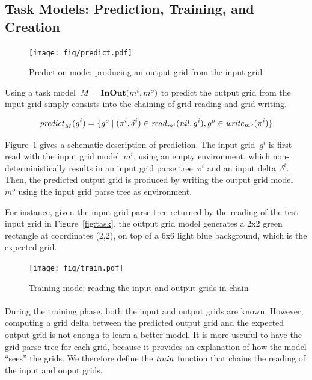 \documentclass[a4paper]{llncs}
\begin{document}
\subsection{Task Models: Prediction, Training, and Creation}
\label{training:predicting}


\begin{figure}[t]
  \centering
  \texttt{[image: fig/predict.pdf]}
  \caption{Prediction mode: producing an output grid from the input grid}
  \label{fig:predict}
\end{figure}

Using a task model~$M = {\bf InOut}(m^i,m^o)$ to predict the output
grid from the input grid simply consists into the chaining of grid reading and grid writing.


\[ {\it predict}_M(g^i) = \{g^o \mid (\pi^i,\delta^i) \in {\it read}_{m^i}({\it nil},g^i), g^o \in {\it write}_{m^o}(\pi^i) \} \]

Figure~\ref{fig:predict} gives a schematic description of
prediction. The input grid~$g^i$ is first read with the input grid
model~$m^i$, using an empty environment, which non-deterministically
results in an input grid parse tree~$\pi^i$ and an input
delta~$\delta^i$. Then, the predicted output grid is produced by
writing the output grid model~$m^o$ using the input grid parse tree as
environment.

For instance, given the input grid parse tree returned by the reading
of the test input grid in Figure~\ref{fig:task}, the output grid model
generates a 2x2 green rectangle at coordinates (2,2), on top of a 6x6
light blue background, which is the expected grid.

\begin{figure}[t]
  \centering
  \texttt{[image: fig/train.pdf]}
  \caption{Training mode: reading the input and output grids in chain}
  \label{fig:train}
\end{figure}

\paragraph{}
During the training phase, both the input and output grids are
known. However, computing a grid delta between the predicted output
grid and the expected output grid is not enough to learn a better
model. It is more useuful to have the grid parse tree for each grid,
because it provides an explanation of how the model ``sees'' the
grids. We therefore define the ${\it train}$ function that chains the
reading of the input and ouput grids.
\end{document}
